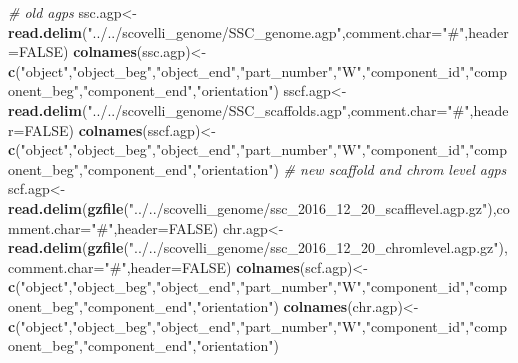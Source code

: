 \documentclass[]{article}
\newenvironment{Shaded}{\begin{snugshade}}{\end{snugshade}}
\newcommand{\KeywordTok}[1]{\textcolor[rgb]{0.13,0.29,0.53}{\textbf{#1}}}
\newcommand{\DataTypeTok}[1]{\textcolor[rgb]{0.13,0.29,0.53}{#1}}
\newcommand{\StringTok}[1]{\textcolor[rgb]{0.31,0.60,0.02}{#1}}
\newcommand{\CommentTok}[1]{\textcolor[rgb]{0.56,0.35,0.01}{\textit{#1}}}
\newcommand{\OtherTok}[1]{\textcolor[rgb]{0.56,0.35,0.01}{#1}}
\newcommand{\NormalTok}[1]{#1}
\begin{document}
\begin{Shaded}
\begin{Highlighting}[]
\CommentTok{# old agps}
\NormalTok{ssc.agp<-}\KeywordTok{read.delim}\NormalTok{(}\StringTok{"../../scovelli_genome/SSC_genome.agp"}\NormalTok{,}\DataTypeTok{comment.char=}\StringTok{"#"}\NormalTok{,}\DataTypeTok{header=}\OtherTok{FALSE}\NormalTok{)}
\KeywordTok{colnames}\NormalTok{(ssc.agp)<-}\KeywordTok{c}\NormalTok{(}\StringTok{"object"}\NormalTok{,}\StringTok{"object_beg"}\NormalTok{,}\StringTok{"object_end"}\NormalTok{,}\StringTok{"part_number"}\NormalTok{,}\StringTok{"W"}\NormalTok{,}\StringTok{"component_id"}\NormalTok{,}\StringTok{"component_beg"}\NormalTok{,}\StringTok{"component_end"}\NormalTok{,}\StringTok{"orientation"}\NormalTok{)}
\NormalTok{sscf.agp<-}\KeywordTok{read.delim}\NormalTok{(}\StringTok{"../../scovelli_genome/SSC_scaffolds.agp"}\NormalTok{,}\DataTypeTok{comment.char=}\StringTok{"#"}\NormalTok{,}\DataTypeTok{header=}\OtherTok{FALSE}\NormalTok{)}
\KeywordTok{colnames}\NormalTok{(sscf.agp)<-}\KeywordTok{c}\NormalTok{(}\StringTok{"object"}\NormalTok{,}\StringTok{"object_beg"}\NormalTok{,}\StringTok{"object_end"}\NormalTok{,}\StringTok{"part_number"}\NormalTok{,}\StringTok{"W"}\NormalTok{,}\StringTok{"component_id"}\NormalTok{,}\StringTok{"component_beg"}\NormalTok{,}\StringTok{"component_end"}\NormalTok{,}\StringTok{"orientation"}\NormalTok{)}
\CommentTok{# new scaffold and chrom level agps}
\NormalTok{scf.agp<-}\KeywordTok{read.delim}\NormalTok{(}\KeywordTok{gzfile}\NormalTok{(}\StringTok{"../../scovelli_genome/ssc_2016_12_20_scafflevel.agp.gz"}\NormalTok{),}\DataTypeTok{comment.char=}\StringTok{"#"}\NormalTok{,}\DataTypeTok{header=}\OtherTok{FALSE}\NormalTok{)}
\NormalTok{chr.agp<-}\KeywordTok{read.delim}\NormalTok{(}\KeywordTok{gzfile}\NormalTok{(}\StringTok{"../../scovelli_genome/ssc_2016_12_20_chromlevel.agp.gz"}\NormalTok{),}\DataTypeTok{comment.char=}\StringTok{"#"}\NormalTok{,}\DataTypeTok{header=}\OtherTok{FALSE}\NormalTok{)}
\KeywordTok{colnames}\NormalTok{(scf.agp)<-}\KeywordTok{c}\NormalTok{(}\StringTok{"object"}\NormalTok{,}\StringTok{"object_beg"}\NormalTok{,}\StringTok{"object_end"}\NormalTok{,}\StringTok{"part_number"}\NormalTok{,}\StringTok{"W"}\NormalTok{,}\StringTok{"component_id"}\NormalTok{,}\StringTok{"component_beg"}\NormalTok{,}\StringTok{"component_end"}\NormalTok{,}\StringTok{"orientation"}\NormalTok{)}
\KeywordTok{colnames}\NormalTok{(chr.agp)<-}\KeywordTok{c}\NormalTok{(}\StringTok{"object"}\NormalTok{,}\StringTok{"object_beg"}\NormalTok{,}\StringTok{"object_end"}\NormalTok{,}\StringTok{"part_number"}\NormalTok{,}\StringTok{"W"}\NormalTok{,}\StringTok{"component_id"}\NormalTok{,}\StringTok{"component_beg"}\NormalTok{,}\StringTok{"component_end"}\NormalTok{,}\StringTok{"orientation"}\NormalTok{)}
\end{Highlighting}
\end{Shaded}
\end{document}
